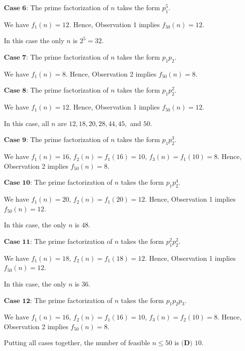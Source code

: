 \begin{enumerate}
 $\textbf{Case 6}$: The prime factorization of $n$ takes the form $p_1^5$.

 We have $f_1 \left( n \right) = 12$. Hence, Observation 1 implies $f_{50} \left( n \right) = 12$.

 In this case the only $n$ is $2^5 = 32$.

 $\textbf{Case 7}$: The prime factorization of $n$ takes the form $p_1 p_2$.

 We have $f_1 \left( n \right) = 8$. Hence, Observation 2 implies $f_{50} \left( n \right) = 8$.

 $\textbf{Case 8}$: The prime factorization of $n$ takes the form $p_1 p_2^2$.

 We have $f_1 \left( n \right) = 12$. Hence, Observation 1 implies $f_{50} \left( n \right) = 12$.

 In this case, all $n$ are $12, 18, 20, 28, 44, 45,$ and $50$.

 $\textbf{Case 9}$: The prime factorization of $n$ takes the form $p_1 p_2^3$.

 We have $f_1 \left( n \right) = 16$, $f_2 \left( n \right) = f_1 \left( 16 \right) = 10$, $f_3 \left( n \right) = f_1 \left( 10 \right) = 8$. Hence, Observation 2 implies $f_{50} \left( n \right) = 8$.

 $\textbf{Case 10}$: The prime factorization of $n$ takes the form $p_1 p_2^4$.

 We have $f_1 \left( n \right) = 20$, $f_2 \left( n \right) = f_1 \left( 20 \right) = 12$. Hence, Observation 1 implies $f_{50} \left( n \right) = 12$.

 In this case, the only $n$ is $48$.

 $\textbf{Case 11}$: The prime factorization of $n$ takes the form $p_1^2 p_2^2$.

 We have $f_1 \left( n \right) = 18$, $f_2 \left( n \right) = f_1 \left( 18 \right) = 12$. Hence, Observation 1 implies $f_{50} \left( n \right) = 12$.

 In this case, the only $n$ is $36$.

 $\textbf{Case 12}$: The prime factorization of $n$ takes the form $p_1 p_2 p_3$.

 We have $f_1 \left( n \right) = 16$, $f_2 \left( n \right) = f_1 \left( 16 \right) = 10$, $f_3 \left( n \right) = f_2 \left( 10 \right) = 8$. Hence, Observation 2 implies $f_{50} \left( n \right) = 8$.

 Putting all cases together, the number of feasible $n \leq 50$ is $\boxed{\textbf{(D) }10}$.


\end{enumerate}
